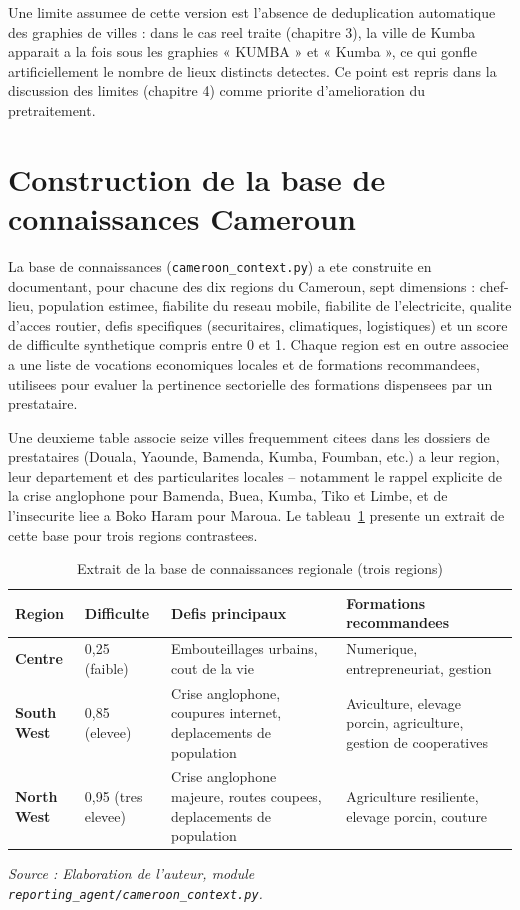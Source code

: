 \documentclass[12pt,a4paper,twoside,openany]{report}
\begin{document}
Une limite assumee de cette version est l'absence de deduplication automatique des graphies de villes : dans le cas reel traite (chapitre 3), la ville de Kumba apparait a la fois sous les graphies « KUMBA » et « Kumba », ce qui gonfle artificiellement le nombre de lieux distincts detectes. Ce point est repris dans la discussion des limites (chapitre 4) comme priorite d'amelioration du pretraitement.

\section{Construction de la base de connaissances Cameroun}

La base de connaissances (\texttt{cameroon\_context.py}) a ete construite en documentant, pour chacune des dix regions du Cameroun, sept dimensions : chef-lieu, population estimee, fiabilite du reseau mobile, fiabilite de l'electricite, qualite d'acces routier, defis specifiques (securitaires, climatiques, logistiques) et un score de difficulte synthetique compris entre 0 et 1. Chaque region est en outre associee a une liste de vocations economiques locales et de formations recommandees, utilisees pour evaluer la pertinence sectorielle des formations dispensees par un prestataire.

Une deuxieme table associe seize villes frequemment citees dans les dossiers de prestataires (Douala, Yaounde, Bamenda, Kumba, Foumban, etc.) a leur region, leur departement et des particularites locales -- notamment le rappel explicite de la crise anglophone pour Bamenda, Buea, Kumba, Tiko et Limbe, et de l'insecurite liee a Boko Haram pour Maroua. Le tableau~\ref{tab:regions_extrait} presente un extrait de cette base pour trois regions contrastees.

\begin{table}[H]
\centering
\caption{Extrait de la base de connaissances regionale (trois regions)}
\label{tab:regions_extrait}
\begin{tabularx}{\textwidth}{>{\bfseries}l X X X}
\toprule
Region & Difficulte & Defis principaux & Formations recommandees \\
\midrule
Centre & 0,25 (faible) & Embouteillages urbains, cout de la vie & Numerique, entrepreneuriat, gestion \\
South West & 0,85 (elevee) & Crise anglophone, coupures internet, deplacements de population & Aviculture, elevage porcin, agriculture, gestion de cooperatives \\
North West & 0,95 (tres elevee) & Crise anglophone majeure, routes coupees, deplacements de population & Agriculture resiliente, elevage porcin, couture \\
\bottomrule
\end{tabularx}
\textit{Source : Elaboration de l'auteur, module \texttt{reporting\_agent/cameroon\_context.py}.}
\end{table}
\end{document}
